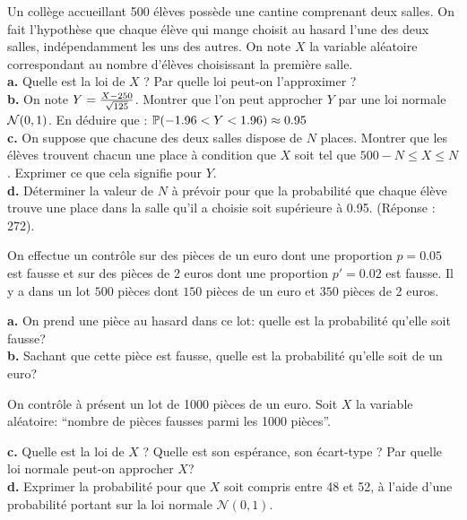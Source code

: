 \bigskip

\begin{exo} Un collège accueillant 500 élèves possède une cantine comprenant deux salles. On fait l'hypothèse que chaque élève qui mange choisit au hasard l'une des deux salles, indépendamment les uns des autres. On note $X$ la variable aléatoire correspondant au nombre d'élèves choisissant la première salle.\\
\noindent\textbf{a.} Quelle est la loi de $X$ ? Par quelle loi peut-on l'approximer ?\\
\noindent\textbf{b.} On note $Y={X-250\over \sqrt{125}}$. Montrer que l'on peut approcher $Y$ par une loi normale ${\cal N}(0,1)$. En déduire que :
$\P(-1.96<Y<1.96)\approx 0.95$
\\
\noindent\textbf{c.} On suppose que chacune des deux salles dispose de $N$ places. Montrer que les élèves trouvent chacun une place à condition que $X$ soit tel que $500-N\leq X\leq N$. Exprimer ce que cela signifie pour $Y$.\\
\noindent\textbf{d.} Déterminer la valeur de $N$ à prévoir pour que la probabilité que chaque élève trouve une place dans la salle qu'il a choisie soit supérieure à 0.95. (Réponse : 272).
\end{exo}

\bigskip

\begin{exo}
On effectue un contrôle sur des pièces de un euro
dont une proportion $p=0.05$ est fausse et sur des pièces 
de 2 euros dont une proportion $p'=0.02$ est fausse.
Il y a dans un lot $500$ pièces dont $150$ pièces de 
un euro et $350$ pièces de 2 euros.

\medskip

\noindent\textbf{a.} On prend une pièce au hasard dans ce lot: quelle est la probabilité qu'elle soit fausse?\\
\noindent\textbf{b.} Sachant que cette pièce est fausse, quelle est la probabilité qu'elle soit de un euro?

\medskip

\noindent On contrôle à présent un lot de 1000 pièces de un euro. Soit $X$ la variable aléatoire: ``nombre de pièces fausses parmi les 1000 pièces''.

\medskip

\noindent\textbf{c.} Quelle est la loi de $X$ ? Quelle est son espérance, son écart-type ? Par quelle loi normale peut-on approcher $X$?\\
\noindent\textbf{d.} Exprimer la probabilité pour que $X$ soit compris entre 48 et 52, à l'aide d'une probabilité portant sur la loi normale $\mathcal N(0,1)$.
\end{exo}

